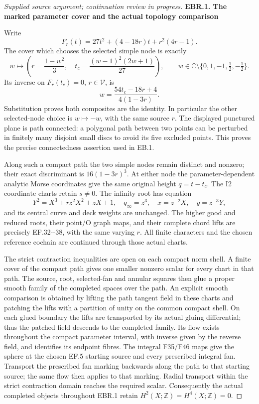 \begin{proof}[Supplied source argument; continuation review in progress]
\par

\medskip\noindent\textbf{EBR.1. The marked parameter cover and the actual topology comparison}

\par\nobreak

Write
\[
 F_r(t)=27t^2+(4-18r)t+r^2(4r-1).
\]
The cover which chooses the selected simple node is exactly
\[
 w\longmapsto
 \left(r=\frac{1-w^2}{3},
 \quad t_c=\frac{(w-1)^2(2w+1)}{27}\right),
 \qquad
 w\in\mathbb C\setminus\{0,1,-1,\tfrac12,-\tfrac12\}.
 \tag{EBR.2}
\]
Its inverse on \(F_r(t_c)=0\), \(r\in\mathcal V\), is
\[
 w=\frac{54t_c-18r+4}{4(1-3r)}.
 \tag{EBR.3}
\]
Substitution proves both composites are the identity. In particular
the other selected-node choice is \(w\mapsto-w\), with the same
source \(r\). The displayed punctured plane is path connected:
a polygonal path between two points can be perturbed in finitely
many disjoint small discs to avoid its five excluded points.
This proves the precise connectedness assertion used in EB.1.

Along such a compact path the two simple nodes remain distinct
and nonzero; their exact discriminant is \(16(1-3r)^3\).
At either node the parameter-dependent analytic Morse coordinates
give the same original height \(q=t-t_c\). The I2 coordinate
charts retain \(s\ne0\). The infinity root has equation
\[
 Y^2=X^3+r z^2X^2+zX+1,
 \quad q_\infty=z^3,\quad x=z^{-2}X,\quad y=z^{-3}Y,
 \tag{EBR.4}
\]
and its central curve and deck weights are unchanged. The higher
good and reduced roots, their point/O graph maps, and their complete
chord lifts are precisely EF.32-\/-38, with the same varying \(r\).
All finite characters and the chosen reference cochain are continued
through those actual charts.

The strict contraction inequalities are open on each compact norm
shell. A finite cover of the compact path gives one smaller nonzero
scalar for every chart in that path. The source, root, selected-fan
and annular squares then glue a proper smooth family of the completed
spaces over the path. An explicit smooth comparison is obtained by
lifting the path tangent field in these charts and patching the lifts
with a partition of unity on the common compact shell. On each glued
boundary the lifts are transported by its actual gluing differential;
thus the patched field descends to the completed family. Its flow
exists throughout the compact parameter interval, with inverse given
by the reverse field, and identifies its endpoint fibres. The
integral F35/F46 maps give the sphere at the chosen EF.5 starting
source and every prescribed integral fan. Transport the prescribed
fan marking backwards along the path to that starting source; the
same flow then applies to that marking. Radial transport within the
strict contraction domain reaches the required scalar. Consequently
the actual completed objects throughout EBR.1 retain
\(H^2(X;\mathbb Z)=H^4(X;\mathbb Z)=0\).


\end{proof}
